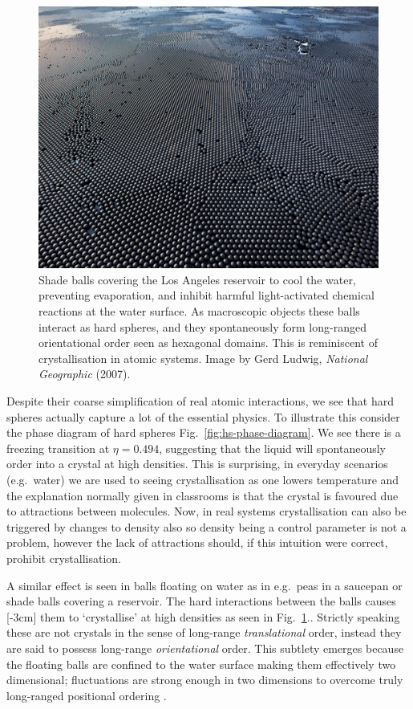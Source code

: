 \documentclass[11pt,twoside]{report}
\begin{document}
\begin{figure}
  \includegraphics[width=0.75\linewidth,outer]{shade-balls}
  \caption[Shade balls floating on water: a 2d `crystal']{
    Shade balls covering the Los Angeles reservoir to cool the water, preventing evaporation, and inhibit harmful light-activated chemical reactions at the water surface.
    As macroscopic objects these balls interact as hard spheres, and they spontaneously form long-ranged orientational order seen as hexagonal domains.
    This is reminiscent of crystallisation in atomic systems.
    Image by Gerd Ludwig, \emph{National Geographic} (2007).}
  \label{fig:shade-balls}
\end{figure}

Despite their coarse simplification of real atomic interactions, we see that hard spheres actually capture a lot of the essential physics.
To illustrate this consider the phase diagram of hard spheres Fig.\ \ref{fig:hs-phase-diagram}.
We see there is a freezing transition at $\eta = 0.494$, suggesting that the liquid will spontaneously order into a crystal at high densities.
This is surprising, in everyday scenarios (e.g.\ water) we are used to seeing crystallisation as one lowers temperature and the explanation normally given in classrooms is that the crystal is favoured due to attractions between molecules.
Now, in real systems crystallisation can also be triggered by changes to density also so density being a control parameter is not a problem, however the lack of attractions should, if this intuition were correct, prohibit crystallisation.

A similar effect is seen in balls floating on water as in e.g.\ peas in a saucepan or shade balls covering a reservoir.
The hard interactions between the balls causes%
[-3cm]
them to `crystallise' at high densities as seen in Fig.\ \ref{fig:shade-balls}..
Strictly speaking these are not crystals in the sense of long-range \emph{translational} order, instead they are said to possess long-range \emph{orientational} order.
This subtlety emerges because the floating balls are confined to the water surface making them effectively two dimensional; fluctuations are strong enough in two dimensions to overcome truly long-ranged positional ordering \cite{MerminPRL1966,MerminPR1968}.
\end{document}
